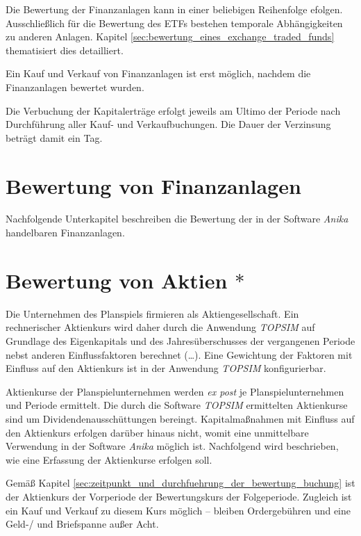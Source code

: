 \documentclass[12pt, a4paper]{article}
\begin{document}
Die Bewertung der Finanzanlagen kann in einer beliebigen Reihenfolge efolgen. 
Ausschließlich für die Bewertung des \glspl{ETF} bestehen temporale Abhängigkeiten zu anderen Anlagen. Kapitel \ref{sec:bewertung_eines_exchange_traded_funds} thematisiert dies detailliert.

Ein Kauf und Verkauf von Finanzanlagen ist erst möglich, nachdem die Finanzanlagen bewertet wurden.

Die Verbuchung der Kapitalerträge erfolgt jeweils am Ultimo der Periode nach Durchführung aller Kauf- und Verkaufbuchungen. 
Die Dauer der Verzinsung beträgt damit ein Tag.

\section{Bewertung von Finanzanlagen}
\label{sec:bewertung_von_finanzanlagen}

Nachfolgende Unterkapitel beschreiben die Bewertung der in der Software \textit{Anika} handelbaren Finanzanlagen.

\section{Bewertung von Aktien $\ast$}
\label{sec:bewertung_von_aktien}
Die Unternehmen des Planspiels firmieren als Aktiengesellschaft.
Ein rechnerischer Aktienkurs wird daher durch die Anwendung \textit{TOPSIM} auf Grundlage des Eigenkapitals und des Jahresüberschusses der vergangenen Periode nebst anderen Einflussfaktoren berechnet (\dots). 
Eine Gewichtung der Faktoren mit Einfluss auf den Aktienkurs ist in der Anwendung \textit{TOPSIM} konfigurierbar. 

Aktienkurse der Planspielunternehmen werden \textit{ex post} je Planspielunternehmen und Periode ermittelt. Die durch die Software \textit{TOPSIM} ermittelten Aktienkurse sind um Dividendenausschüttungen bereingt. Kapitalmaßnahmen mit Einfluss auf den Aktienkurs erfolgen darüber hinaus nicht, womit eine unmittelbare Verwendung in der Software \textit{Anika} möglich ist. Nachfolgend wird beschrieben, wie eine Erfassung der Aktienkurse erfolgen soll.

Gemäß Kapitel \ref{sec:zeitpunkt_und_durchfuehrung_der_bewertung_buchung} ist der Aktienkurs der Vorperiode der Bewertungskurs der Folgeperiode.
Zugleich ist ein Kauf und Verkauf zu diesem Kurs möglich -- bleiben Ordergebühren und eine Geld-/ und Briefspanne außer Acht. 

\end{document}
